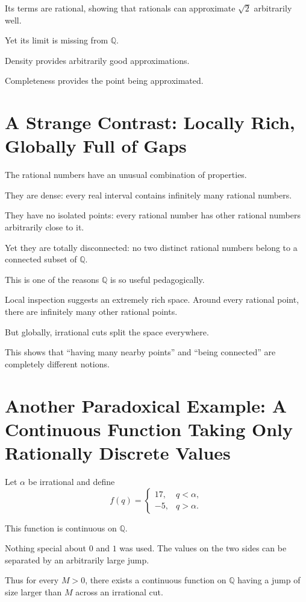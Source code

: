 \documentclass{essay}
\begin{document}
Its terms are rational, showing that rationals can approximate \(\sqrt{2}\)
arbitrarily well.

Yet its limit is missing from \(\mathbb{Q}\).

Density provides arbitrarily good approximations.

Completeness provides the point being approximated.

\section{A Strange Contrast: Locally Rich, Globally Full of Gaps}

The rational numbers have an unusual combination of properties.

They are dense:
every real interval contains infinitely many rational numbers.

They have no isolated points:
every rational number has other rational numbers arbitrarily close to it.

Yet they are totally disconnected:
no two distinct rational numbers belong to a connected subset of
\(\mathbb{Q}\).

This is one of the reasons \(\mathbb{Q}\) is so useful pedagogically.

Local inspection suggests an extremely rich space. Around every rational
point, there are infinitely many other rational points.

But globally, irrational cuts split the space everywhere.

This shows that ``having many nearby points'' and ``being connected'' are
completely different notions.

\section{Another Paradoxical Example: A Continuous Function Taking Only
Rationally Discrete Values}

Let \(\alpha\) be irrational and define
\[
f(q)=
\begin{cases}
17,&q<\alpha,\\
-5,&q>\alpha.
\end{cases}
\]

This function is continuous on \(\mathbb{Q}\).

Nothing special about \(0\) and \(1\) was used. The values on the two sides
can be separated by an arbitrarily large jump.

Thus for every \(M>0\), there exists a continuous function on
\(\mathbb{Q}\) having a jump of size larger than \(M\) across an irrational
cut.
\end{document}
